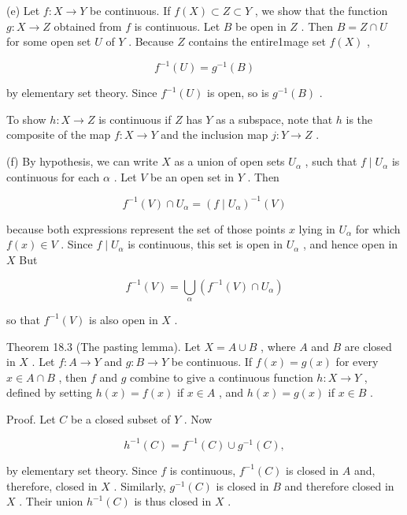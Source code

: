 \documentclass[10pt]{article}
\begin{document}
(e) Let \(f : X \rightarrow  Y\) be continuous. If \(f\left( X\right)  \subset  Z \subset  Y\) , we show that the function \(g : X \rightarrow  Z\) obtained from \(f\) is continuous. Let \(B\) be open in \(Z\) . Then \(B = Z \cap  U\) for some open set \(U\) of \(Y\) . Because \(Z\) contains the entire1mage set \(f\left( X\right)\) ,

\[
{f}^{-1}\left( U\right)  = {g}^{-1}\left( B\right)
\]

by elementary set theory. Since \({f}^{-1}\left( U\right)\) is open, so is \({g}^{-1}\left( B\right)\) .

To show \(h : X \rightarrow  Z\) is continuous if \(Z\) has \(Y\) as a subspace, note that \(h\) is the composite of the map \(f : X \rightarrow  Y\) and the inclusion map \(j : Y \rightarrow  Z\) .

(f) By hypothesis, we can write \(X\) as a union of open sets \({U}_{\alpha }\) , such that \(f \mid  {U}_{\alpha }\) is continuous for each \(\alpha\) . Let \(V\) be an open set in \(Y\) . Then

\[
{f}^{-1}\left( V\right)  \cap  {U}_{\alpha } = {\left( f \mid  {U}_{\alpha }\right) }^{-1}\left( V\right)
\]

because both expressions represent the set of those points \(x\) lying in \({U}_{\alpha }\) for which \(f\left( x\right)  \in  V\) . Since \(f \mid  {U}_{\alpha }\) is continuous, this set is open in \({U}_{\alpha }\) , and hence open in \(X\) But

\[
{f}^{-1}\left( V\right)  = \mathop{\bigcup }\limits_{\alpha }\left( {{f}^{-1}\left( V\right)  \cap  {U}_{\alpha }}\right)
\]

so that \({f}^{-1}\left( V\right)\) is also open in \(X\) .

Theorem 18.3 (The pasting lemma). Let \(X = A \cup  B\) , where \(A\) and \(B\) are closed in \(X\) . Let \(f : A \rightarrow  Y\) and \(g : B \rightarrow  Y\) be continuous. If \(f\left( x\right)  = g\left( x\right)\) for every \(x \in  A \cap  B\) , then \(f\) and \(g\) combine to give a continuous function \(h : X \rightarrow  Y\) , defined by setting \(h\left( x\right)  = f\left( x\right)\) if \(x \in  A\) , and \(h\left( x\right)  = g\left( x\right)\) if \(x \in  B\) .

Proof. Let \(C\) be a closed subset of \(Y\) . Now

\[
{h}^{-1}\left( C\right)  = {f}^{-1}\left( C\right)  \cup  {g}^{-1}\left( C\right) ,
\]

by elementary set theory. Since \(f\) is continuous, \({f}^{-1}\left( C\right)\) is closed in \(A\) and, therefore, closed in \(X\) . Similarly, \({g}^{-1}\left( C\right)\) is closed in \(B\) and therefore closed in \(X\) . Their union \({h}^{-1}\left( C\right)\) is thus closed in \(X\) .
\end{document}
